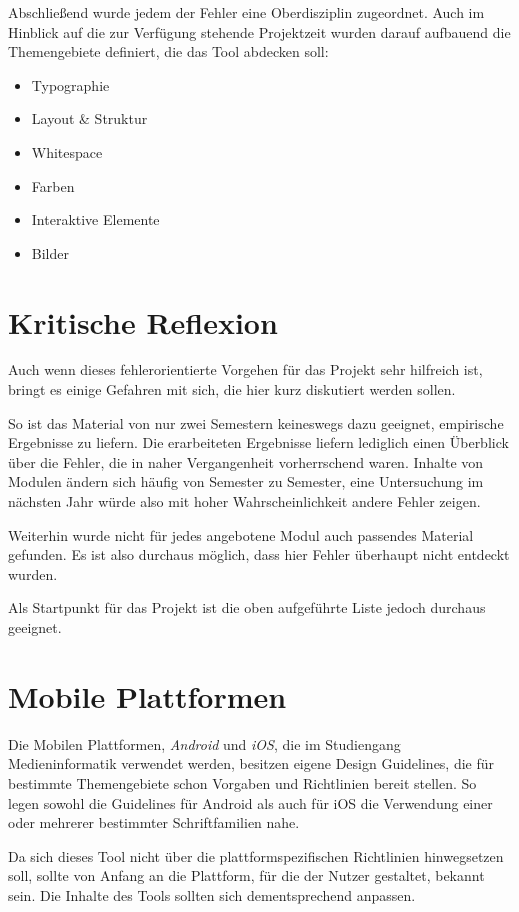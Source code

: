 Abschließend wurde jedem der Fehler eine Oberdisziplin zugeordnet. Auch im Hinblick auf die zur Verfügung stehende Projektzeit wurden darauf aufbauend die Themengebiete definiert, die das Tool abdecken soll:
\begin{itemize}
	\item Typographie
	\item Layout \& Struktur
	\item Whitespace
	\item Farben
	\item Interaktive Elemente
	\item Bilder
\end{itemize}



\section{Kritische Reflexion}
Auch wenn dieses fehlerorientierte Vorgehen für das Projekt sehr hilfreich ist, bringt es einige Gefahren mit sich, die hier kurz diskutiert werden sollen.

So ist das Material von nur zwei Semestern keineswegs dazu geeignet, empirische Ergebnisse zu liefern. Die erarbeiteten Ergebnisse liefern lediglich einen Überblick über die Fehler, die in naher Vergangenheit vorherrschend waren. Inhalte von Modulen ändern sich häufig von Semester zu Semester, eine Untersuchung im nächsten Jahr würde also mit hoher Wahrscheinlichkeit andere Fehler zeigen.

Weiterhin wurde nicht für jedes angebotene Modul auch passendes Material gefunden. Es ist also durchaus möglich, dass hier Fehler überhaupt nicht entdeckt wurden.

Als Startpunkt für das Projekt ist die oben aufgeführte Liste jedoch durchaus geeignet.



\section{Mobile Plattformen} \label{Mobile Plattformen}
Die Mobilen Plattformen, \textit{Android} und \textit{iOS}, die im Studiengang Medieninformatik verwendet werden, besitzen eigene Design Guidelines, die für bestimmte Themengebiete schon Vorgaben und Richtlinien bereit stellen. So legen sowohl die Guidelines für Android als auch für iOS die Verwendung einer oder mehrerer bestimmter Schriftfamilien nahe.

Da sich dieses Tool nicht über die plattformspezifischen Richtlinien hinwegsetzen soll, sollte von Anfang an die Plattform, für die der Nutzer gestaltet, bekannt sein. Die Inhalte des Tools sollten sich dementsprechend anpassen.


\clearpage
